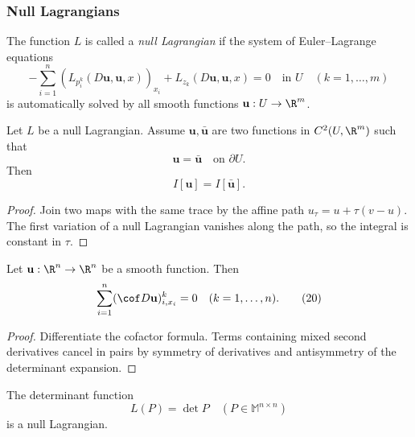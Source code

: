 \subsubsection{Null Lagrangians}

\begin{definition}
\label{def:null-lagrangian}
The function $L$ is called a \textit{null Lagrangian} if the system of Euler--Lagrange equations
\[
-\sum_{i=1}^{n} (L_{p_i^k}(D\mathbf{u}, \mathbf{u}, x))_{x_i} + L_{z_k}(D\mathbf{u}, \mathbf{u}, x) = 0 \quad \text{in } U \quad (k = 1, \ldots, m)
\tag{17}
\]
is automatically solved by all smooth functions $\mathbf{u} : U \to \R^m$.
\end{definition}

\begin{theorem}
\label{thm:null-lagrangians-boundary-conditions}
Let $L$ be a null Lagrangian. Assume $\mathbf{u}, \bar{\mathbf{u}}$ are two functions in $C^2(U, \R^m)$ such that
\[
\mathbf{u} = \bar{\mathbf{u}} \quad \text{on } \partial U .
\tag{18}
\]
Then
\[
I[\mathbf{u}] = I[\bar{\mathbf{u}}] .
\tag{19}
\]
\end{theorem}

\begin{proof}
\sketch Join two maps with the same trace by the affine path $u_\tau=u+\tau(v-u)$. The first variation of a null Lagrangian vanishes along the path, so the integral is constant in $\tau$.
\end{proof}

\begin{lemma}
\label{lem:cofactor-divergence-free}
Let $\mathbf{u} : \R^n \to \R^n$ be a smooth function. Then
\[
\sum_{i=1}^n (\cof D\mathbf{u})^k_{i,x_i} = 0 \quad (k = 1, \ldots, n).
\tag{20}
\]
\end{lemma}

\begin{proof}
\sketch Differentiate the cofactor formula. Terms containing mixed second derivatives cancel in pairs by symmetry of derivatives and antisymmetry of the determinant expansion.
\end{proof}

\begin{theorem}
\label{thm:determinant-null-lagrangian}
The determinant function
\[
L(P) = \det P \quad (P \in \mathbb{M}^{n \times n})
\]
is a null Lagrangian.
\end{theorem}

